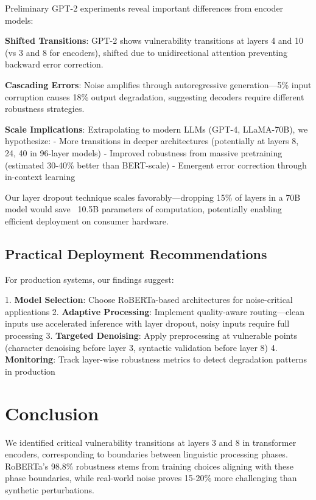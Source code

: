 \documentclass{article}
\begin{document}
Preliminary GPT-2 experiments reveal important differences from encoder models:

\textbf{Shifted Transitions}: GPT-2 shows vulnerability transitions at layers 4 and 10 (vs 3 and 8 for encoders), shifted due to unidirectional attention preventing backward error correction.

\textbf{Cascading Errors}: Noise amplifies through autoregressive generation—5\% input corruption causes 18\% output degradation, suggesting decoders require different robustness strategies.

\textbf{Scale Implications}: Extrapolating to modern LLMs (GPT-4, LLaMA-70B), we hypothesize:
- More transitions in deeper architectures (potentially at layers 8, 24, 40 in 96-layer models)
- Improved robustness from massive pretraining (estimated 30-40\% better than BERT-scale)
- Emergent error correction through in-context learning

Our layer dropout technique scales favorably—dropping 15\% of layers in a 70B model would save ~10.5B parameters of computation, potentially enabling efficient deployment on consumer hardware.

\subsection{Practical Deployment Recommendations}

For production systems, our findings suggest:

1. \textbf{Model Selection}: Choose RoBERTa-based architectures for noise-critical applications
2. \textbf{Adaptive Processing}: Implement quality-aware routing—clean inputs use accelerated inference with layer dropout, noisy inputs require full processing
3. \textbf{Targeted Denoising}: Apply preprocessing at vulnerable points (character denoising before layer 3, syntactic validation before layer 8)
4. \textbf{Monitoring}: Track layer-wise robustness metrics to detect degradation patterns in production

\section{Conclusion}

We identified critical vulnerability transitions at layers 3 and 8 in transformer encoders, corresponding to boundaries between linguistic processing phases. RoBERTa's 98.8\% robustness stems from training choices aligning with these phase boundaries, while real-world noise proves 15-20\% more challenging than synthetic perturbations.
\end{document}
